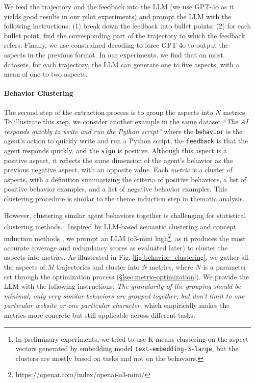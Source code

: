 We feed the trajectory and the feedback into the LLM (we use GPT-4o \citep{openai2024gpt4ocard}
as it yields good results in our pilot experiments) and prompt the LLM with the following
instructions: (1) break down the feedback into bullet points; (2) for each bullet
point, find the corresponding part of the trajectory to which the feedback
refers. Finally, we use constrained decoding to force GPT-4o to output the
aspects in the previous format. In our experiments, we find that on most
datasets, for each trajectory, the LLM can generate one to five aspects, with a mean
of one to two aspects.

\paragraph{Behavior Clustering}

The second step of the extraction process is to group the aspects into $N$ metrics.
To illustrate this step, we consider another example in the same dataset \textsl{``The
AI responds quickly to write and run the Python script``} where the \texttt{behavior}
is the agent's action to quickly write and run a Python script, the \texttt{feedback}
is that the agent responds quickly, and the \texttt{sign} is positive. Although
this aspect is a positive aspect, it reflects the same dimension of the agent's behavior
as the previous negative aspect, with an opposite value. Each \emph{metric} is a
cluster of aspects, with a definition summarizing the criteria of positive behaviors,
a list of positive behavior examples, and a list of negative behavior examples.
This clustering procedure is similar to the theme induction step in thematic
analysis.

However, clustering similar agent behaviors together is challenging for statistical
clustering methods.\footnote{ In preliminary experiments, we tried to use K-means
clustering on the aspect vectors generated by embedding model \texttt{text-embedding-3-large},
but the clusters are mostly based on tasks and not on the behaviors. } Inspired by
LLM-based semantic clustering and concept induction methods \citep{viswanathan2024large,lam2024concept},
we prompt an LLM (o3-mini high\footnote{https://openai.com/index/openai-o3-mini/},
as it produces the most accurate coverage and redundancy scores as evaluated
later) to cluster the aspects into metrics. As illustrated in Fig. \ref{fig:behavior_clustering},
we gather all the aspects of $M$ trajectories and cluster into $N$ metrics, where
$N$ is a parameter set through the optimization process (\S\ref{sec:metric-optimization}).
We provide the LLM with the following instructions: \emph{The granularity of the
grouping should be minimal; only very similar behaviors are grouped together;
but don't limit to one particular website or one particular character}, which
empirically makes the metrics more concrete but still applicable across
different tasks.

